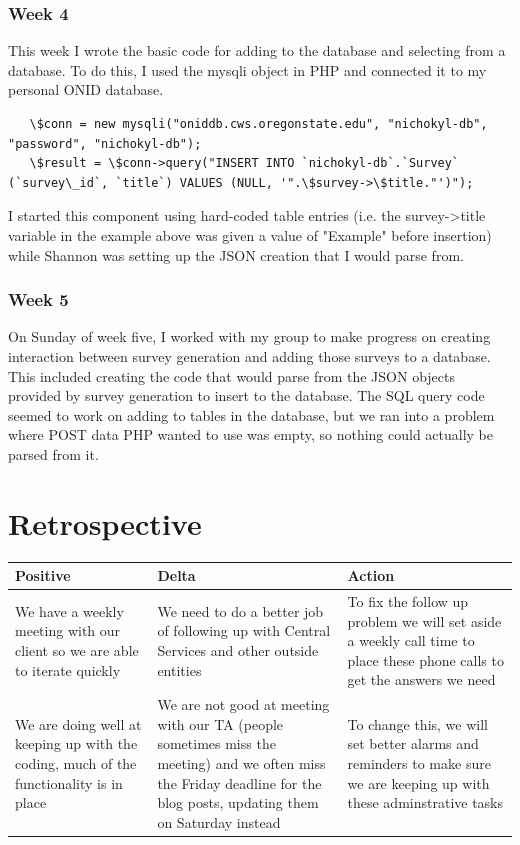 \documentclass[letterpaper,10pt,serif, draftclsnofoot,onecolumn, compsoc, titlepage]{IEEEtran}
\begin{document}
\subsubsection{Week 4}
This week I wrote the basic code for adding to the database and selecting from a database.
To do this, I used the mysqli object in PHP and connected it to my personal ONID database.
\begin{lstlisting}
   \$conn = new mysqli("oniddb.cws.oregonstate.edu", "nichokyl-db", "password", "nichokyl-db");
   \$result = \$conn->query("INSERT INTO `nichokyl-db`.`Survey` (`survey\_id`, `title`) VALUES (NULL, '".\$survey->\$title."')");
\end{lstlisting}
I started this component using hard-coded table entries (i.e. the survey->title variable in the example above was given a value of "Example" before insertion) while Shannon was setting up the JSON creation that I would parse from.
\subsubsection{Week 5}
On Sunday of week five, I worked with my group to make progress on creating interaction between survey generation and adding those surveys to a database.
This included creating the code that would parse from the JSON objects provided by survey generation to insert to the database.
The SQL query code seemed to work on adding to tables in the database, but we ran into a problem where POST data PHP wanted to use was empty, so nothing could actually be parsed from it.

\section{Retrospective}
\begin{center}
    \begin{tabular}{ | p{5cm} | p{5cm} | p{5cm} |}
    \hline
     Positive & Delta & Action \\ \hline
	We have a weekly meeting with our client so we are able to iterate quickly & We need to do a better job of following up with Central Services and other outside entities & To fix the follow up problem we will set aside a weekly call time to place these phone calls to get the answers we need \\ \hline
  	We are doing well at keeping up with the coding, much of the functionality is in place & We are not good at meeting with our TA (people sometimes miss the meeting) and we often miss the Friday deadline for the blog posts, updating them on Saturday instead & To change this, we will set better alarms and reminders to make sure we are keeping up with these adminstrative tasks \\ \hline
    \end{tabular}
\end{center}
\end{document}
